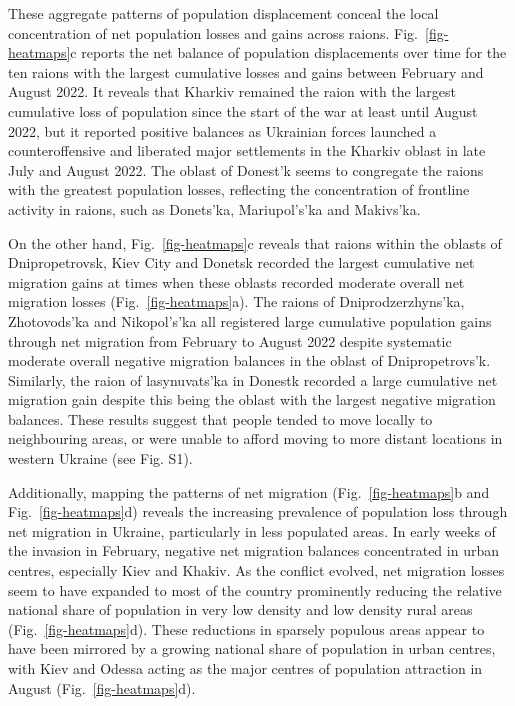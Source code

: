 \documentclass[
  11pt,
]{article}
\begin{document}
These aggregate patterns of population displacement conceal the local
concentration of net population losses and gains across raions.
Fig.~\ref{fig-heatmaps}c reports the net balance of population
displacements over time for the ten raions with the largest cumulative
losses and gains between February and August 2022. It reveals that
Kharkiv remained the raion with the largest cumulative loss of
population since the start of the war at least until August 2022, but it
reported positive balances as Ukrainian forces launched a
counteroffensive and liberated major settlements in the Kharkiv oblast
in late July and August 2022. The oblast of Donest'k seems to congregate
the raions with the greatest population losses, reflecting the
concentration of frontline activity in raions, such as Donets'ka,
Mariupol's'ka and Makivs'ka.

On the other hand, Fig.~\ref{fig-heatmaps}c reveals that raions within
the oblasts of Dnipropetrovsk, Kiev City and Donetsk recorded the
largest cumulative net migration gains at times when these oblasts
recorded moderate overall net migration losses
(Fig.~\ref{fig-heatmaps}a). The raions of Dniprodzerzhyns'ka,
Zhotovods'ka and Nikopol's'ka all registered large cumulative population
gains through net migration from February to August 2022 despite
systematic moderate overall negative migration balances in the oblast of
Dnipropetrovs'k. Similarly, the raion of lasynuvats'ka in Donestk
recorded a large cumulative net migration gain despite this being the
oblast with the largest negative migration balances. These results
suggest that people tended to move locally to neighbouring areas, or
were unable to afford moving to more distant locations in western
Ukraine (see Fig. S1).

Additionally, mapping the patterns of net migration
(Fig.~\ref{fig-heatmaps}b and Fig.~\ref{fig-heatmaps}d) reveals the
increasing prevalence of population loss through net migration in
Ukraine, particularly in less populated areas. In early weeks of the
invasion in February, negative net migration balances concentrated in
urban centres, especially Kiev and Khakiv. As the conflict evolved, net
migration losses seem to have expanded to most of the country
prominently reducing the relative national share of population in very
low density and low density rural areas (Fig.~\ref{fig-heatmaps}d).
These reductions in sparsely populous areas appear to have been mirrored
by a growing national share of population in urban centres, with Kiev
and Odessa acting as the major centres of population attraction in
August (Fig.~\ref{fig-heatmaps}d).
\end{document}

